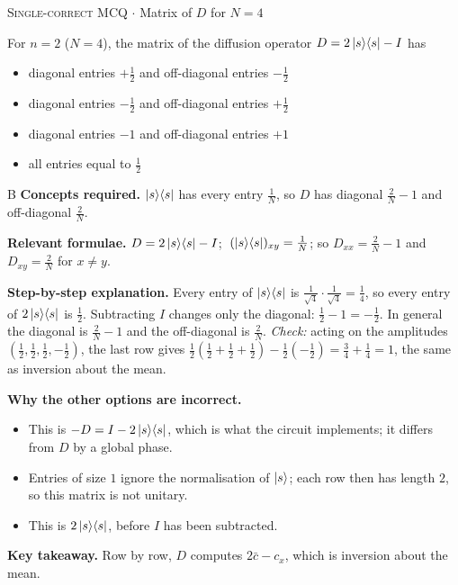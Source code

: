 \documentclass[11pt,a4paper]{article}
\newcommand{\optlabel}[1]{\textbf{(#1)}}
\newcommand{\correctlabel}[1]{\textcolor{okgreen}{\textbf{(#1)}\,\ding{51}}}
\newenvironment{qitem}[1]{\begin{list}{}{\setlength{\leftmargin}{3.3em}\setlength{\labelwidth}{3.1em}%
  \setlength{\labelsep}{0.2em}\setlength{\topsep}{3pt}\setlength{\parsep}{3pt}}\item[\textbf{Q.#1}\hfill]}{\end{list}}
\newcommand{\qsep}{\par\vspace{2pt}{\color{black!15}\hrule}\vspace{4pt}}
\newcommand{\qmeta}[2]{{\footnotesize\color{black!60}\textsc{#1} \;$\cdot$\; #2}\par}
\begin{document}
\begin{qitem}{44}
\qmeta{Single-correct MCQ}{Matrix of $D$ for $N = 4$}
For $n = 2$ ($N = 4$), the matrix of the diffusion operator $D = 2\ket{s}\!\bra{s} - I$ has
\begin{itemize}[leftmargin=2.6em, labelsep=0.4em, itemsep=2pt, topsep=3pt]
\item[\optlabel{A}] diagonal entries $+\frac12$ and off-diagonal entries $-\frac12$
\item[\correctlabel{B}] diagonal entries $-\frac12$ and off-diagonal entries $+\frac12$
\item[\optlabel{C}] diagonal entries $-1$ and off-diagonal entries $+1$
\item[\optlabel{D}] all entries equal to $\frac12$
\end{itemize}
\end{qitem}
\begin{solbox}{B}
\textbf{\color{brand}Concepts required.} $\ket{s}\!\bra{s}$ has every entry $\frac1N$, so $D$ has diagonal $\frac2N - 1$ and off-diagonal $\frac2N$.

\textbf{\color{brand}Relevant formulae.} $D = 2\ket{s}\!\bra{s} - I$; $\;(\ket{s}\!\bra{s})_{xy} = \frac1N$; so $D_{xx} = \frac2N - 1$ and $D_{xy} = \frac2N$ for $x \ne y$.

\textbf{\color{brand}Step-by-step explanation.} Every entry of $\ket{s}\!\bra{s}$ is $\frac{1}{\sqrt4}\cdot\frac{1}{\sqrt4} = \frac14$, so every entry of $2\ket{s}\!\bra{s}$ is $\frac12$. Subtracting $I$ changes only the diagonal: $\frac12 - 1 = -\frac12$. In general the diagonal is $\frac2N - 1$ and the off-diagonal is $\frac2N$.
\emph{Check:} acting on the amplitudes $(\frac12, \frac12, \frac12, -\frac12)$, the last row gives $\frac12(\frac12 + \frac12 + \frac12) - \frac12(-\frac12) = \frac34 + \frac14 = 1$, the same as inversion about the mean.

\textbf{\color{brand}Why the other options are incorrect.}
\begin{itemize}[leftmargin=2.4em, itemsep=1pt, topsep=2pt]
\item[\textbf{(A)}] This is $-D = I - 2\ket{s}\!\bra{s}$, which is what the circuit implements; it differs from $D$ by a global phase.
\item[\textbf{(C)}] Entries of size $1$ ignore the normalisation of $\ket{s}$; each row then has length $2$, so this matrix is not unitary.
\item[\textbf{(D)}] This is $2\ket{s}\!\bra{s}$, before $I$ has been subtracted.
\end{itemize}
\textbf{\color{brand}Key takeaway.} Row by row, $D$ computes $2\bar c - c_x$, which is inversion about the mean.
\end{solbox}
\qsep
\end{document}
